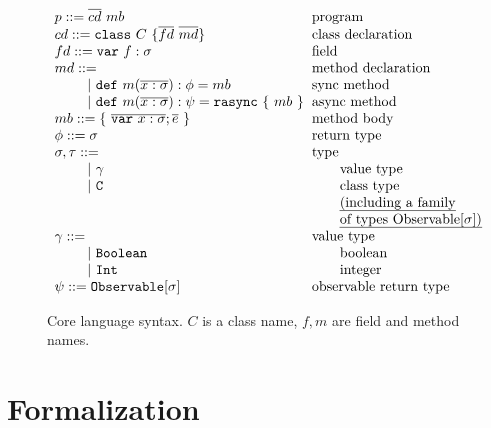 \documentclass{acm_proc_article-sp}
\newcommand{\gap}{\quad\quad}
\newcommand{\ba}{\begin{array}}
\newcommand{\ea}{\end{array}}
\newcommand{\seq}[1]{\overline{#1}}
\begin{document}
\begin{figure}
  \centering
$\ba[t]{l@{\hspace{2mm}}l}
p    ::=  \seq{cd}~mb                                & \mbox{program}             \\
cd   ::=  \texttt{class}~C~\{\seq{fd}~\seq{md}\}     & \mbox{class declaration}   \\
fd   ::=  \texttt{var}~f: \sigma                     & \mbox{field}               \\
md   ::=                                             & \mbox{method declaration}  \\
\gap ~|~  \texttt{def}~m(\seq{x: \sigma}): \phi = mb & \mbox{sync method}         \\
\gap ~|~  \texttt{def}~m(\seq{x: \sigma}): \psi = \texttt{rasync}~\{~mb~\}  & \mbox{async method} \\
mb   ::=  \{~\seq{\texttt{var}~x: \sigma};\seq{e}~\} & \mbox{method body}         \\
\phi ::=  \sigma                                     & \mbox{return type}         \\
\sigma,\tau ::=                                      & \mbox{type}                \\
\gap ~|~  \gamma                                     & \gap\mbox{value type}      \\
\gap ~|~  \texttt{C}                                 & \gap\mbox{class type}      \\
                                                     & \gap\mbox{\em{(including a family}} \\
                                                     & \gap\mbox{\em{of types \texttt{Observable}$[\sigma]$)}} \\
\gamma ::=                                           & \mbox{value type} \\
\gap ~|~  \texttt{Boolean}                           & \gap\mbox{boolean}         \\
\gap ~|~  \texttt{Int}                               & \gap\mbox{integer}         \\
\psi ::= \texttt{Observable$[\sigma]$}               & \mbox{observable return type}    \\
\ea$
  \caption{Core language syntax. $C$ is a class name, $f,m$ are field and
    method names.}
  \label{fig:lang-syntax}
\end{figure}

\section{Formalization}
\end{document}
